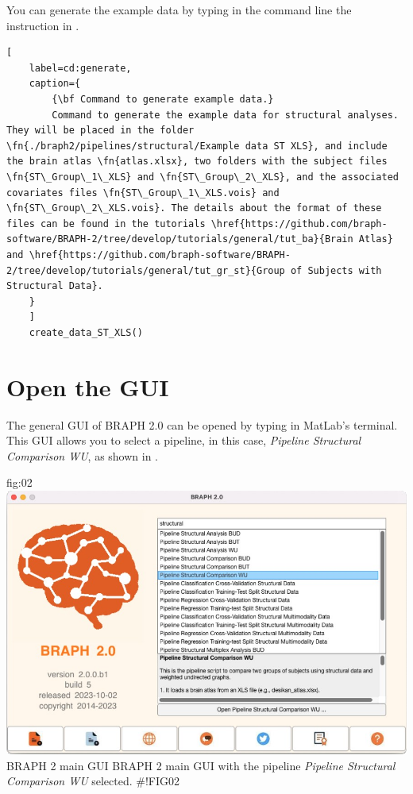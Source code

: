 \documentclass[justified]{tufte-handout}
\begin{document}
You can generate the example data by typing in the command line the instruction in .
%
\begin{lstlisting}[
	label=cd:generate,
	caption={
		{\bf Command to generate example data.}
		Command to generate the example data for structural analyses. They will be placed in the folder \fn{./braph2/pipelines/structural/Example data ST XLS}, and include the brain atlas \fn{atlas.xlsx}, two folders with the subject files \fn{ST\_Group\_1\_XLS} and \fn{ST\_Group\_2\_XLS}, and the associated covariates files \fn{ST\_Group\_1\_XLS.vois} and \fn{ST\_Group\_2\_XLS.vois}. The details about the format of these files can be found in the tutorials \href{https://github.com/braph-software/BRAPH-2/tree/develop/tutorials/general/tut_ba}{Brain Atlas} and \href{https://github.com/braph-software/BRAPH-2/tree/develop/tutorials/general/tut_gr_st}{Group of Subjects with Structural Data}.
	}
	]
	create_data_ST_XLS()
\end{lstlisting}


\section{Open the GUI}

The general GUI of BRAPH 2.0 can be opened by typing  in MatLab's terminal. This GUI allows you to select a pipeline, in this case, \emph{Pipeline Structural Comparison WU}, as shown in .

{fig:02}
{\includegraphics{fig02.jpg}
}
{BRAPH 2 main GUI}
{
	BRAPH 2 main GUI with the pipeline \emph{Pipeline Structural Comparison WU} selected.
}
#!FIG02
\end{document}
